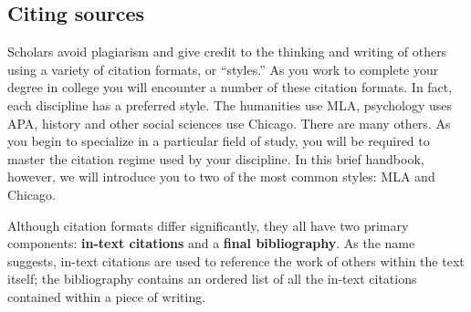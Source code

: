\subsection{Citing sources}

Scholars avoid plagiarism and give credit to the thinking and writing of others using a variety of citation formats, or ``styles.'' As you work to complete your degree in college you will encounter a number of these citation formats. In fact, each discipline has a preferred style. The humanities use MLA, psychology uses APA, history and other social sciences use Chicago. There are many others. As you begin to specialize in a particular field of study, you will be required to master the citation regime used by your discipline. In this brief handbook, however, we will introduce you to two of the most common styles: MLA and Chicago.

Although citation formats differ significantly, they all have two primary components: \textbf{in-text citations} and a \textbf{final bibliography}. As the name suggests, in-text citations are used to reference the work of others within the text itself; the bibliography contains an ordered list of all the in-text citations contained within a piece of writing.

